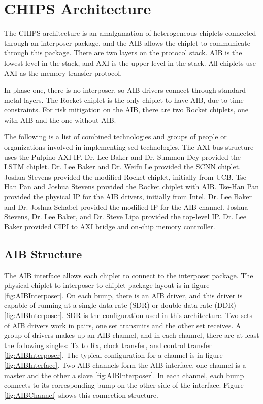 \documentclass[../main.tex]{subfiles}
\begin{document}
\section{CHIPS Architecture}
\label{sec:CHIPS-Arch}
The CHIPS architecture is an amalgamation of heterogeneous chiplets connected through an interposer package, and the AIB allows the chiplet to communicate through this package\cite{AIBWhitePaper}. There are two layers on the protocol stack. AIB is the lowest level in the stack, and AXI is the upper level in the stack. All chiplets use AXI as the memory transfer protocol.

In phase one, there is no interposer, so AIB drivers connect through standard metal layers. The Rocket chiplet is the only chiplet to have AIB, due to time constraints. For risk mitigation on the AIB, there are two Rocket chiplets, one with AIB and the one without AIB. 

The following is a list of combined technologies and groups of people or organizations involved in implementing sed technologies. The AXI bus structure uses the Pulpino AXI IP. Dr. Lee Baker and Dr. Summon Dey provided the LSTM chiplet. Dr. Lee Baker and Dr. Weifu Le provided the SCNN chiplet. Joshua Stevens provided the modified Rocket chiplet, initially from UCB. Tse-Han Pan and Joshua Stevens provided the Rocket chiplet with AIB. Tse-Han Pan provided the physical IP for the AIB drivers, initially from Intel. Dr. Lee Baker and Dr. Joshua Schabel provided the modified IP for the AIB channel. Joshua Stevens, Dr. Lee Baker, and Dr. Steve Lipa provided the top-level IP. Dr. Lee Baker provided CIPI to AXI bridge and on-chip memory controller. 

\subsection{AIB Structure}
The AIB interface allows each chiplet to connect to the interposer package. The physical chiplet to interposer to chiplet package layout is in figure \ref{fig:AIBInterposer}. On each bump, there is an AIB driver, and this driver is capable of running at a single data rate (SDR) or double data rate (DDR)  \ref{fig:AIBInterposer}. SDR is the configuration used in this architecture. Two sets of AIB drivers work in pairs, one set transmits and the other set receives. A group of drivers makes up an AIB channel, and in each channel, there are at least the following singles: Tx to Rx, clock transfer, and control transfer \ref{fig:AIBInterposer}. The typical configuration for a channel is in figure \ref{fig:AIBInterface}. Two AIB channels form the AIB interface, one channel is a master and the other a slave  \ref{fig:AIBInterposer}. In each channel, each bump connects to its corresponding bump on the other side of the interface. Figure \ref{fig:AIBChannel} shows this connection structure.  
\end{document}
